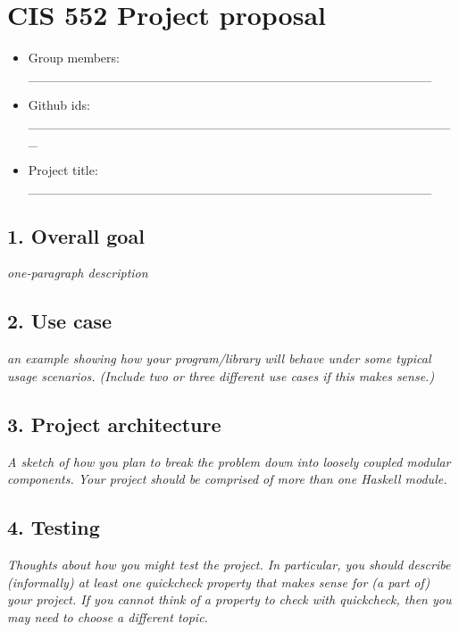 \documentclass[
]{article}
\date{}
\begin{document}
\hypertarget{cis-552-project-proposal}{%
\section{CIS 552 Project proposal}\label{cis-552-project-proposal}}

\begin{itemize}
\item
  Group members:
  \_\_\_\_\_\_\_\_\_\_\_\_\_\_\_\_\_\_\_\_\_\_\_\_\_\_\_\_\_\_\_\_\_\_\_\_\_\_\_\_\_\_\_
\item
  Github ids:
  \_\_\_\_\_\_\_\_\_\_\_\_\_\_\_\_\_\_\_\_\_\_\_\_\_\_\_\_\_\_\_\_\_\_\_\_\_\_\_\_\_\_\_\_\_\_
\item
  Project title:
  \_\_\_\_\_\_\_\_\_\_\_\_\_\_\_\_\_\_\_\_\_\_\_\_\_\_\_\_\_\_\_\_\_\_\_\_\_\_\_\_\_\_\_
\end{itemize}

\hypertarget{overall-goal}{%
\subsection{1. Overall goal}\label{overall-goal}}

\emph{one-paragraph description}

\hypertarget{use-case}{%
\subsection{2. Use case}\label{use-case}}

\emph{an example showing how your program/library will behave under some
typical usage scenarios. (Include two or three different use cases if
this makes sense.)}

\hypertarget{project-architecture}{%
\subsection{3. Project architecture}\label{project-architecture}}

\emph{A sketch of how you plan to break the problem down into loosely
coupled modular components. Your project should be comprised of more
than one Haskell module.}

\hypertarget{testing}{%
\subsection{4. Testing}\label{testing}}

\emph{Thoughts about how you might test the project. In particular, you
should describe (informally) at least one quickcheck property that makes
sense for (a part of) your project. If you cannot think of a property to
check with quickcheck, then you may need to choose a different topic.}
\end{document}
